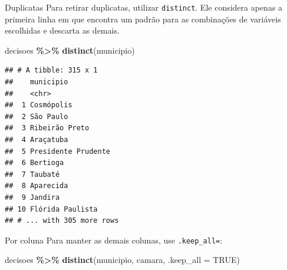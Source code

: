 \documentclass[
  9pt,
  ignorenonframetext,
]{beamer}
\newenvironment{Shaded}{\begin{snugshade}}{\end{snugshade}}
\newcommand{\DataTypeTok}[1]{\textcolor[rgb]{0.13,0.29,0.53}{#1}}
\newcommand{\KeywordTok}[1]{\textcolor[rgb]{0.13,0.29,0.53}{\textbf{#1}}}
\newcommand{\NormalTok}[1]{#1}
\newcommand{\OperatorTok}[1]{\textcolor[rgb]{0.81,0.36,0.00}{\textbf{#1}}}
\newcommand{\OtherTok}[1]{\textcolor[rgb]{0.56,0.35,0.01}{#1}}
\newcommand{\StringTok}[1]{\textcolor[rgb]{0.31,0.60,0.02}{#1}}
\begin{document}
\begin{frame}[fragile]{Duplicatas}
\protect\hypertarget{duplicatas-1}{}
Para retirar duplicatas, utilizar \texttt{distinct}. Ele considera
apenas a primeira linha em que encontra um padrão para as combinações de
variáveis escolhidas e descarta as demais.

\begin{Shaded}
\begin{Highlighting}[]
\NormalTok{decisoes }\OperatorTok{\%\textgreater{}\%}\StringTok{ }
\StringTok{  }\KeywordTok{distinct}\NormalTok{(municipio)}
\end{Highlighting}
\end{Shaded}
\end{frame}

\begin{frame}[fragile]{}
\protect\hypertarget{section-7}{}
\begin{verbatim}
## # A tibble: 315 x 1
##    municipio          
##    <chr>              
##  1 Cosmópolis         
##  2 São Paulo          
##  3 Ribeirão Preto     
##  4 Araçatuba          
##  5 Presidente Prudente
##  6 Bertioga           
##  7 Taubaté            
##  8 Aparecida          
##  9 Jandira            
## 10 Flórida Paulista   
## # ... with 305 more rows
\end{verbatim}
\end{frame}

\begin{frame}[fragile]{Por coluna}
\protect\hypertarget{por-coluna-1}{}
Para manter as demais colunas, use \texttt{.keep\_all=}:

\begin{Shaded}
\begin{Highlighting}[]
\NormalTok{decisoes }\OperatorTok{\%\textgreater{}\%}
\StringTok{  }\KeywordTok{distinct}\NormalTok{(municipio, camara, }
           \DataTypeTok{.keep\_all =} \OtherTok{TRUE}\NormalTok{)}
\end{Highlighting}
\end{Shaded}
\end{frame}
\end{document}
